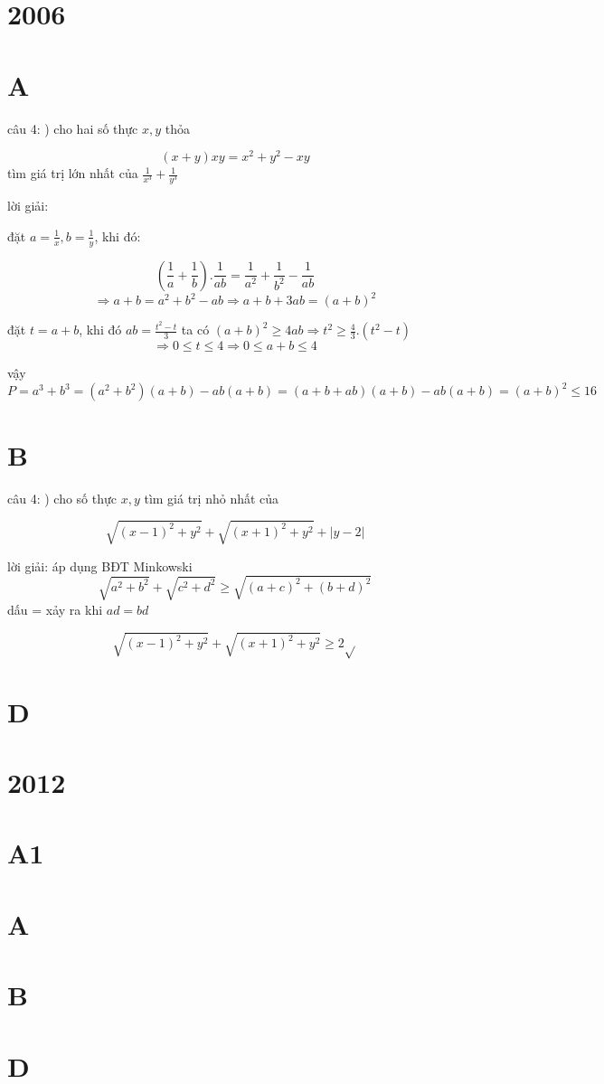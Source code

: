 \documentclass{article}
\begin{document}
\section*{2006}
\section*{A}

câu 4:
) cho hai số thực $x,y$ thỏa







\[(x+y)xy=x^2+y^2-xy\]
tìm giá trị lớn nhất của $\frac{1}{x^3}+\frac{1}{y^3}$

lời giải:







đặt $a=\frac{1}{x}, b=\frac{1}{y}$, khi đó:






\[(\frac{1}{a}+\frac{1}{b}).\frac{1}{ab}=\frac{1}{a^2}+\frac{1}{b^2}-\frac{1}{ab}\]
\[\Rightarrow a+b=a^2+b^2-ab\Rightarrow a+b+3ab=(a+b)^2\]

đặt $t=a+b$, khi đó $ab=\frac{t^2-t}{3}$
ta có $(a+b)^2\geq4ab\Rightarrow t^2\geq\frac{4}{3}.(t^2-t)$
\[\Rightarrow 0\leq t \leq 4 \Rightarrow 0\leq a+b \leq 4\]

vậy $P=a^3+b^3=(a^2+b^2)(a+b)-ab(a+b)=(a+b+ab)(a+b)-ab(a+b)=(a+b)^2\leq16$

\section*{B}


câu 4:
) cho số thực $x,y$ tìm giá trị nhỏ nhất của








\[\sqrt{(x-1)^2+y^2}+\sqrt{(x+1)^2+y^2}+|y-2| \]

lời giải: áp dụng BĐT Minkowski
\[\sqrt{a^2+b^2}+\sqrt{c^2+d^2}\geq\sqrt{(a+c)^2+(b+d)^2}\]
dấu = xảy ra khi $ad=bd$






\[\sqrt{(x-1)^2+y^2}+\sqrt{(x+1)^2+y^2}\geq 2\sqrt{}\]


\section*{D}

\section*{2012}
\section*{A1}
\section*{A}
\section*{B}
\section*{D}
\end{document}
